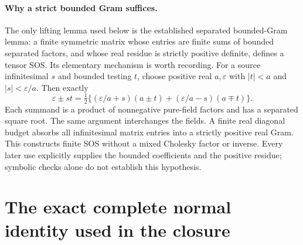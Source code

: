 \paragraph{Why a strict bounded Gram suffices.}
The only lifting lemma used below is the established separated
bounded-Gram lemma: a finite symmetric matrix whose entries are
finite sums of bounded separated factors, and whose real residue
is strictly positive definite, defines a tensor SOS. Its elementary
mechanism is worth recording. For a source infinitesimal $s$ and
bounded testing $t$, choose positive real $a,\varepsilon$ with
$|t|<a$ and $|s|<\varepsilon/a$. Then exactly
\[
 \varepsilon\pm st=\tfrac12
 \{(\varepsilon/a+s)(a\pm t)
            +(\varepsilon/a-s)(a\mp t)\}.
\]
Each summand is a product of nonnegative pure-field factors and
has a separated square root. The same argument interchanges the
fields. A finite real diagonal budget absorbs all infinitesimal
matrix entries into a strictly positive real Gram. This constructs
finite SOS without a mixed Cholesky factor or inverse. Every later
use explicitly supplies the bounded coefficients and the positive
residue; symbolic checks alone do not establish this hypothesis.

\section{The exact complete normal identity used in the closure}

